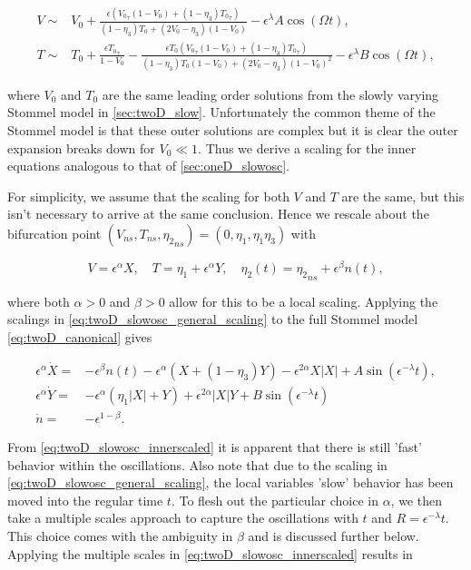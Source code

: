 \begin{equation}\label{eq:twoD_slowosc_outersoln}
\begin{aligned}
V\sim& V_0 + \frac{\epsilon({V_0}_\tau(1-V_0)+(1-\eta_3){T_0}_\tau)}{(1-\eta_3)T_0+(2V_0-\eta_3)(1-V_0)}-\epsilon^\lambda A \cos(\Omega t),\\
T\sim& T_0 + \frac{\epsilon {T_0}_\tau}{1-V_0}-\frac{\epsilon T_0({V_0}_\tau(1-V_0)+(1-\eta_3){T_0}_\tau)}{(1-\eta_3)T_0(1-V_0)+(2V_0-\eta_3)(1-V_0)^2}-\epsilon^\lambda B \cos(\Omega t),
\end{aligned}
\end{equation}

where $V_0$ and $T_0$ are the same leading order solutions from the slowly varying Stommel model in \autoref{sec:twoD_slow}. Unfortunately the common theme of the Stommel model is that these outer solutions are complex but it is clear the outer expansion breaks down for $V_0\ll 1$. Thus we derive a scaling for the inner equations analogous to that of \autoref{sec:oneD_slowosc}.

For simplicity, we assume that the scaling for both $V$ and $T$ are the same, but this isn't necessary to arrive at the same conclusion. Hence we rescale about the bifurcation point $(V_{ns},T_{ns},{\eta_2}_{ns})=(0,\eta_1,\eta_1\eta_3)$ with

\begin{equation}\label{eq:twoD_slowosc_general_scaling}
V=\epsilon^\alpha X, \quad T=\eta_1+\epsilon^\alpha Y ,\quad \eta_2(t)={\eta_2}_{ns}+\epsilon^\beta n(t),
\end{equation}

where both $\alpha>0$ and $\beta>0$ allow for this to be a local scaling. Applying the scalings in \eqref{eq:twoD_slowosc_general_scaling} to the full Stommel model \eqref{eq:twoD_canonical} gives

\begin{equation}\label{eq:twoD_slowosc_innerscaled}
\begin{aligned}
\epsilon^\alpha \dot{X}=& -\epsilon^\beta n(t)-\epsilon^\alpha (X+(1-\eta_3)Y) - \epsilon^{2\alpha}X|X| +A\sin(\epsilon^{-\lambda}t),\\
\epsilon^\alpha \dot{Y}=&-\epsilon^\alpha(\eta_1|X|+Y)+\epsilon^{2\alpha}|X|Y +B\sin(\epsilon^{-\lambda} t)\\
\dot{n}=&-\epsilon^{1-\beta}.
\end{aligned}
\end{equation}

From \eqref{eq:twoD_slowosc_innerscaled} it is apparent that there is still 'fast' behavior within the oscillations. Also note that due to the scaling in \eqref{eq:twoD_slowosc_general_scaling}, the local variables 'slow' behavior has been moved into the regular time $t$. To flesh out the particular choice in $\alpha$, we then take a multiple scales approach to capture the oscillations with $t$ and $R=\epsilon^{-\lambda}t$. This choice comes with the ambiguity in $\beta$ and is discussed further below. Applying the multiple scales in \eqref{eq:twoD_slowosc_innerscaled} results in

